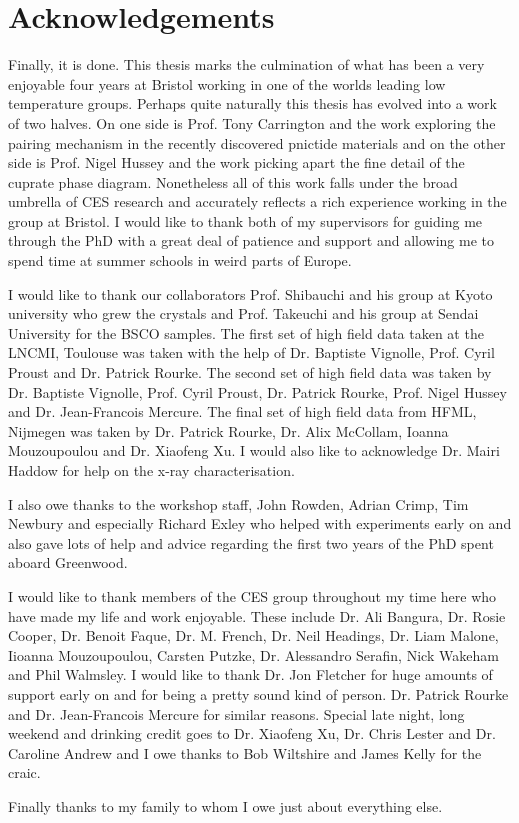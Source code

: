 \cleardoublepage

\section*{Acknowledgements}

Finally, it is done. This thesis marks the culmination of what has been a very enjoyable four years at Bristol working in one of the worlds leading low temperature groups. Perhaps quite naturally this thesis has evolved into a work of two halves. On one side is Prof. Tony Carrington and the work exploring the pairing mechanism in the recently discovered pnictide materials and on the other side is Prof. Nigel Hussey and the work picking apart the fine detail of the cuprate phase diagram. Nonetheless all of this work falls under the broad umbrella of CES research and accurately reflects a rich experience working in the group at Bristol. I would like to thank both of my supervisors for guiding me through the PhD with a great deal of patience and support and allowing me to spend time at summer schools in weird parts of Europe.

I would like to thank our collaborators Prof. Shibauchi and his group at Kyoto university who grew the \BaFeAsP{} crystals and Prof. Takeuchi and his group at Sendai University for the \acs{BSCO} samples. The first set of high field data taken at the \ac{LNCMI}, Toulouse was taken with the help of Dr. Baptiste Vignolle, Prof. Cyril Proust and Dr. Patrick Rourke. The second set of high field data was taken by Dr. Baptiste Vignolle, Prof. Cyril Proust, Dr. Patrick Rourke, Prof. Nigel Hussey and Dr. Jean-Francois Mercure. The final set of high field data from \ac{HFML}, Nijmegen was taken by Dr. Patrick Rourke, Dr. Alix McCollam, Ioanna Mouzoupoulou and Dr. Xiaofeng Xu. I would also like to acknowledge Dr. Mairi Haddow for help on the x-ray characterisation.

I also owe thanks to the workshop staff, John Rowden, Adrian Crimp, Tim Newbury and especially Richard Exley who helped with experiments early on and also gave lots of help and advice regarding the first two years of the PhD spent aboard Greenwood.

I would like to thank members of the CES group throughout my time here who have made my life and work enjoyable. These include Dr. Ali Bangura, Dr. Rosie Cooper, Dr. Benoit Faque, Dr. M. French, Dr. Neil Headings, Dr. Liam Malone, Iioanna Mouzoupoulou, Carsten Putzke, Dr. Alessandro Serafin, Nick Wakeham and Phil Walmsley. I would like to thank Dr. Jon Fletcher for huge amounts of support early on and for being a pretty sound kind of person. Dr. Patrick Rourke and Dr. Jean-Francois Mercure for similar reasons. Special late night, long weekend and drinking credit goes to Dr. Xiaofeng Xu, Dr. Chris Lester and Dr. Caroline Andrew and I owe thanks to Bob Wiltshire and James Kelly for the craic.

Finally thanks to my family to whom I owe just about everything else.




